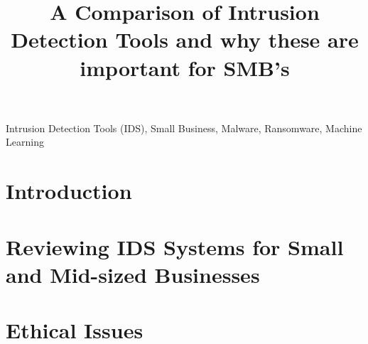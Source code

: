 \documentclass[conference]{IEEEtran}
\begin{document}
\title{A Comparison of Intrusion Detection Tools and why these are important for SMB's\\}

\author{
}


\maketitle




\begin{IEEEkeywords}

Intrusion Detection Tools (IDS), Small Business, Malware, Ransomware, Machine Learning

\end{IEEEkeywords}

\section{Introduction}


\section{Reviewing IDS Systems for Small and Mid-sized Businesses}


\newpage

\section{Ethical Issues}

\end{document}
